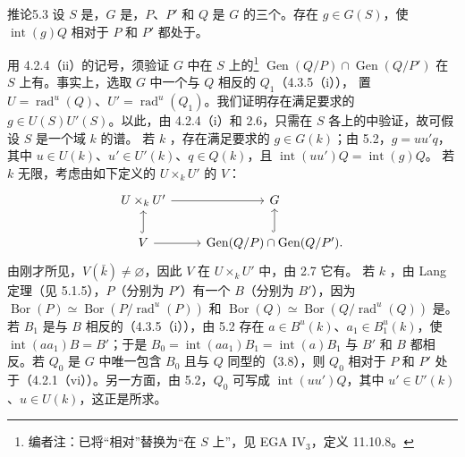 \begin{SGAresult}{推论}{5.3}
设 $S$ 是，$G$ 是，$P$、$P'$ 和 $Q$ 是 $G$ 的三个。存在 $g\in G(S)$，使 $\operatorname{int}(g)Q$ 相对于 $P$ 和 $P'$ 都处于。
\end{SGAresult}
用 4.2.4（ii）的记号，须验证 $G$ 中在 $S$ 上的\footnote{编者注：已将“相对”替换为“在 $S$ 上”，见 EGA IV$_3$，定义 11.10.8。} $\operatorname{Gen}(Q/P)\cap\operatorname{Gen}(Q/P')$ 在 $S$ 上有。事实上，选取 $G$ 中一个与 $Q$ 相反的 $Q_1$（4.3.5（i）），
置 $U=\operatorname{rad}^{u}(Q)$、$U'=\operatorname{rad}^{u}(Q_1)$。我们证明存在满足要求的 $g\in U(S)U'(S)$。以此，由 4.2.4（i）和 2.6，只需在 $S$ 各上的中验证，故可假设 $S$ 是一个域 $k$ 的谱。
若 $k$ ，存在满足要求的 $g\in G(k)$；由 5.2，$g=uu'q$，其中 $u\in U(k)$、$u'\in U'(k)$、$q\in Q(k)$，且 $\operatorname{int}(uu')Q=\operatorname{int}(g)Q$。
若 $k$ 无限，考虑由如下定义的 $U\times_kU'$ 的 $V$：
\[
\begin{tikzcd}
 U\times_kU'\arrow[r]&G\\
 V\arrow[u,hook]\arrow[r]&\operatorname{Gen}(Q/P)\cap\operatorname{Gen}(Q/P')\arrow[u,hook].
\end{tikzcd}
\]
由刚才所见，$V(\bar k)\neq\varnothing$，因此 $V$ 在 $U\times_kU'$ 中，由 2.7 它有。
若 $k$ ，由 Lang 定理（见 5.1.5），$P$（分别为 $P'$）有一个 $B$（分别为 $B'$），因为 $\operatorname{Bor}(P)\simeq\operatorname{Bor}(P/\operatorname{rad}^{u}(P))$ 和 $\operatorname{Bor}(Q)\simeq\operatorname{Bor}(Q/\operatorname{rad}^{u}(Q))$ 是。若 $B_1$ 是与 $B$ 相反的（4.3.5（i）），由 5.2 存在 $a\in B^u(k)$、$a_1\in B_1^u(k)$，使 $\operatorname{int}(aa_1)B=B'$；于是 $B_0=\operatorname{int}(aa_1)B_1=\operatorname{int}(a)B_1$ 与 $B'$ 和 $B$ 都相反。若 $Q_0$ 是 $G$ 中唯一包含 $B_0$ 且与 $Q$ 同型的（3.8），则 $Q_0$ 相对于 $P$ 和 $P'$ 处于（4.2.1（vi））。另一方面，由 5.2，$Q_0$ 可写成 $\operatorname{int}(uu')Q$，其中 $u'\in U'(k)$、$u\in U(k)$，这正是所求。

